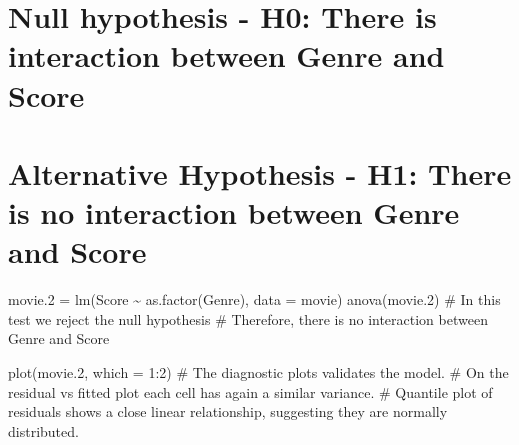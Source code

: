 \documentclass[
]{article}
\begin{document}
\hypertarget{null-hypothesis---h0-there-is-interaction-between-genre-and-score}{%
\section{Null hypothesis - H0: There is interaction between Genre and
Score}\label{null-hypothesis---h0-there-is-interaction-between-genre-and-score}}

\hypertarget{alternative-hypothesis---h1-there-is-no-interaction-between-genre-and-score}{%
\section{Alternative Hypothesis - H1: There is no interaction between
Genre and
Score}\label{alternative-hypothesis---h1-there-is-no-interaction-between-genre-and-score}}

movie.2 = lm(Score \textasciitilde{} as.factor(Genre), data = movie)
anova(movie.2) \# In this test we reject the null hypothesis \#
Therefore, there is no interaction between Genre and Score

plot(movie.2, which = 1:2) \# The diagnostic plots validates the model.
\# On the residual vs fitted plot each cell has again a similar
variance. \# Quantile plot of residuals shows a close linear
relationship, suggesting they are normally distributed.
\end{document}
